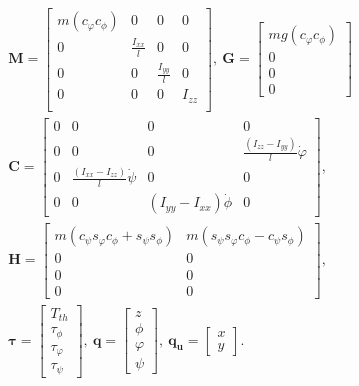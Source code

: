 \documentclass[AMA,STIX1COL,sort, compress]{WileyNJD-v2}
\begin{document}
\begin{align*}
&\mathbf M =
\begin{bmatrix}
m(c_{\varphi}c_{\phi}) & 0 & 0 & 0 \\
0 & \frac{I_{xx}}{l} & 0 & 0\\
0 & 0 & \frac{I_{yy}}{l} & 0\\
0 & 0 & 0 & I_{zz}\\	
\end{bmatrix},~
\mathbf G = 
\begin{bmatrix}
mg(c_{\varphi}c_{\phi}) \\ 0 \\ 0 \\ 0
\end{bmatrix} \\
& \mathbf C = 
\begin{bmatrix}
0 & 0 & 0 & 0 \\ 
0 & 0 & 0 & \frac{(I_{zz} - I_{yy})}{l}\dot{\varphi}\\
0 & \frac{(I_{xx} - I_{zz})}{l}\dot{\psi} & 0 & 0 \\ 
0 & 0 & {(I_{yy} - I_{xx})}\dot{\phi}& 0
\end{bmatrix}	,\\
& \mathbf{H}=
\begin{bmatrix}
m(c_{\psi}s_{\varphi}c_{\phi} + s_{\psi}s_{\phi})  & m(s_{\psi}s_{\varphi}c_{\phi} - c_{\psi} s_{\phi}) \\ 
0 & 0\\
0 & 0 \\ 
0 & 0 
\end{bmatrix},\\
& \boldsymbol \tau = 
\begin{bmatrix}
T_{th} \\ \tau_\phi \\ \tau_\varphi \\ \tau_\psi
\end{bmatrix}, ~\mathbf q = 
\begin{bmatrix}
z \\ \phi \\ \varphi \\ \psi
\end{bmatrix},~\mathbf{q_u} = 
\begin{bmatrix}
x \\ y
\end{bmatrix}.
\end{align*}
%

\end{document}
